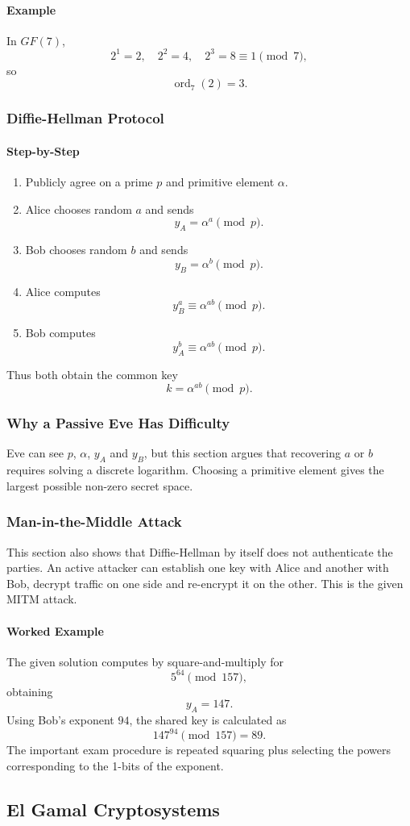 \documentclass[12pt]{article}
\newcommand{\Step}{\paragraph{Step-by-Step}}
\newcommand{\Example}{\paragraph{Example}}
\newcommand{\Exam}{\paragraph{Worked Example}}
\begin{document}
\Example In $GF(7)$,
\[
2^1=2,\quad2^2=4,\quad2^3=8\equiv1\pmod7,
\]
so
\[
\operatorname{ord}_7(2)=3.
\]

\subsubsection{Diffie-Hellman Protocol}
\Step
\begin{enumerate}
    \item Publicly agree on a prime $p$ and primitive element $\alpha$.
    \item Alice chooses random $a$ and sends
    \[
    y_A=\alpha^a\pmod p.
    \]
    \item Bob chooses random $b$ and sends
    \[
    y_B=\alpha^b\pmod p.
    \]
    \item Alice computes
    \[
    y_B^a\equiv\alpha^{ab}\pmod p.
    \]
    \item Bob computes
    \[
    y_A^b\equiv\alpha^{ab}\pmod p.
    \]
\end{enumerate}
Thus both obtain the common key
\[
k=\alpha^{ab}\pmod p.
\]

\subsubsection{Why a Passive Eve Has Difficulty}
Eve can see $p$, $\alpha$, $y_A$ and $y_B$, but this section argues that recovering $a$ or $b$ requires solving a discrete logarithm. Choosing a primitive element gives the largest possible non-zero secret space.

\subsubsection{Man-in-the-Middle Attack}
This section also shows that Diffie-Hellman by itself does not authenticate the parties. An active attacker can establish one key with Alice and another with Bob, decrypt traffic on one side and re-encrypt it on the other. This is the given MITM attack.

\Exam{}
The given solution computes by square-and-multiply for
\[
5^{64}\pmod{157},
\]
obtaining
\[
y_A=147.
\]
Using Bob's exponent $94$, the shared key is calculated as
\[
147^{94}\pmod{157}=89.
\]
The important exam procedure is repeated squaring plus selecting the powers corresponding to the 1-bits of the exponent.

\subsection{El Gamal Cryptosystems}
\end{document}
